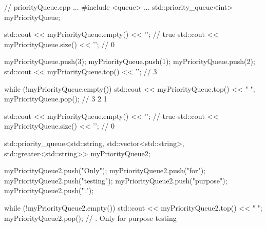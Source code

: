 
\begin{cpp}
// priorityQueue.cpp
...
#include <queue>
...
std::priority_queue<int> myPriorityQueue;

std::cout << myPriorityQueue.empty() << '\n'; // true
std::cout << myPriorityQueue.size() << '\n'; // 0

myPriorityQueue.push(3);
myPriorityQueue.push(1);
myPriorityQueue.push(2);
std::cout << myPriorityQueue.top() << '\n'; // 3

while (!myPriorityQueue.empty()){
	std::cout << myPriorityQueue.top() << " ";
	myPriorityQueue.pop();
} // 3 2 1

std::cout << myPriorityQueue.empty() << '\n'; // true
std::cout << myPriorityQueue.size() << '\n'; // 0

std::priority_queue<std::string, std::vector<std::string>,
					std::greater<std::string>> myPriorityQueue2;

myPriorityQueue2.push("Only");
myPriorityQueue2.push("for");
myPriorityQueue2.push("testing");
myPriorityQueue2.push("purpose");
myPriorityQueue2.push(".");

while (!myPriorityQueue2.empty()){
	std::cout << myPriorityQueue2.top() << " ";
	myPriorityQueue2.pop();
} // . Only for purpose testing
\end{cpp}









